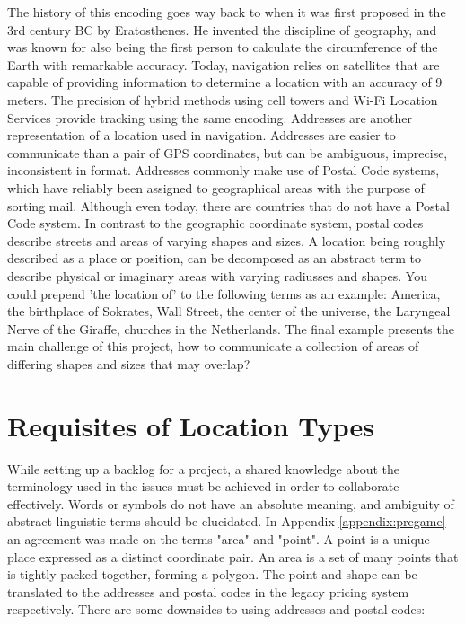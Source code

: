 The history of this encoding goes way back to when it was first proposed in the 3rd century BC by Eratosthenes. He invented the discipline of geography, and was known for also being the first person to calculate the circumference of the Earth with remarkable accuracy. Today, navigation relies on satellites that are capable of providing information to determine a location with an accuracy of 9 meters. The precision of hybrid methods using cell towers and Wi-Fi Location Services provide tracking using the same encoding. Addresses are another representation of a location used in navigation. Addresses are easier to communicate than a pair of GPS coordinates, but can be ambiguous, imprecise, inconsistent in format. Addresses commonly make use of Postal Code systems, which have reliably been assigned to geographical areas with the purpose of sorting mail. Although even today, there are countries that do not have a Postal Code system. In contrast to the geographic coordinate system, postal codes describe streets and areas of varying shapes and sizes. A location being roughly described as a place or position, can be decomposed as an abstract term to describe physical or imaginary areas with varying radiusses and shapes. You could prepend 'the location of' to the following terms as an example: America, the birthplace of Sokrates, Wall Street, the center of the universe, the Laryngeal Nerve of the Giraffe, churches in the Netherlands. The final example presents the main challenge of this project, how to communicate a collection of areas of differing shapes and sizes that may overlap?

%
\section{Requisites of Location Types}
While setting up a backlog for a project, a shared knowledge about the terminology used in the issues must be achieved in order to collaborate effectively. Words or symbols do not have an absolute meaning, and ambiguity of abstract linguistic terms should be elucidated. In Appendix \ref{appendix:pregame} an agreement was made on the terms "area" and "point".
A point is a unique place expressed as a distinct coordinate pair. An area is a set of many points that is tightly packed together, forming a polygon. The point and shape can be translated to the addresses and postal codes in the legacy pricing system respectively. There are some downsides to using addresses and postal codes:


